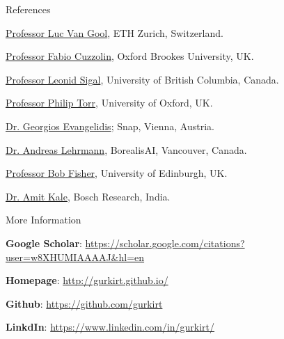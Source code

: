 \documentclass{resume} %
\begin{document}
\begin{rSection}{References}  \itemsep -2pt
\item \href{https://ee.ethz.ch/the-department/faculty/professors/person-detail.OTAyMzM=.TGlzdC80MTEsMTA1ODA0MjU5.html}{Professor Luc Van Gool}, ETH Zurich, Switzerland.
\item \href{http://cms.brookes.ac.uk/staff/FabioCuzzolin/}{Professor Fabio Cuzzolin}, Oxford Brookes University, UK.
\item \href{https://www.cs.ubc.ca/~lsigal/}{Professor Leonid Sigal}, University of British Columbia, Canada.
\item \href{http://www.robots.ox.ac.uk/~phst/}{Professor Philip Torr}, University of Oxford, UK.
\item \href{https://team.inria.fr/perception/team-members/evangelidis/}{Dr. Georgios Evangelidis}; Snap, Vienna, Austria.
\item \href{https://ps.is.tuebingen.mpg.de/person/alehrmann}{Dr. Andreas Lehrmann}, BorealisAI, Vancouver, Canada.
\item \href{http://homepages.inf.ed.ac.uk/rbf/}{Professor Bob Fisher}, University of Edinburgh, UK.
\item \href{http://www.cfar.umd.edu/~kale/}{Dr. Amit Kale}, Bosch Research, India.
\end{rSection}

\begin{rSection}{More Information}  \itemsep -2pt
  \item \textbf{Google Scholar}: \url{https://scholar.google.com/citations?user=w8XHUMIAAAAJ&hl=en}
  \item \textbf{Homepage}: \url{http://gurkirt.github.io/}
  \item \textbf{Github}: \url{https://github.com/gurkirt}
  \item \textbf{LinkdIn}: \url{https://www.linkedin.com/in/gurkirt/}
\end{rSection}
\end{document}
